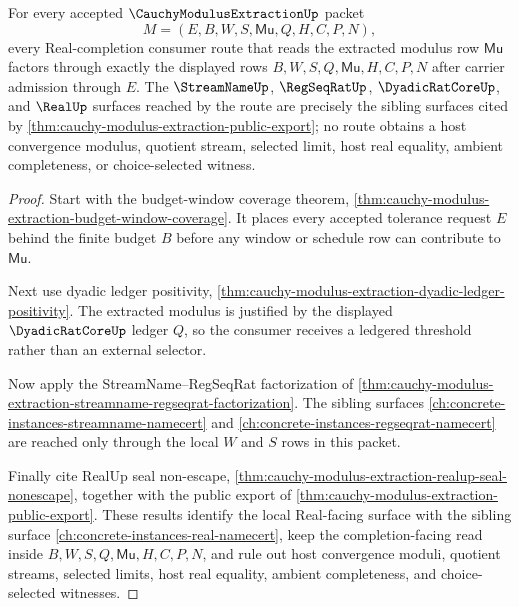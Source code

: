 \begin{theorem}
\label{thm:cauchy-modulus-extraction-real-completion-consumer-bridge}
For every accepted $\CauchyModulusExtractionUp$ packet
$$
M=(E,B,W,S,\mathsf{Mu},Q,H,C,P,N),
$$
every Real-completion consumer route that reads the extracted modulus row $\mathsf{Mu}$ factors through exactly the displayed rows $B,W,S,Q,\mathsf{Mu},H,C,P,N$ after carrier admission through $E$. The $\StreamNameUp$, $\RegSeqRatUp$, $\DyadicRatCoreUp$, and $\RealUp$ surfaces reached by the route are precisely the sibling surfaces cited by \autoref{thm:cauchy-modulus-extraction-public-export}; no route obtains a host convergence modulus, quotient stream, selected limit, host real equality, ambient completeness, or choice-selected witness.
\end{theorem}
\begin{proof}
Start with the budget-window coverage theorem, \autoref{thm:cauchy-modulus-extraction-budget-window-coverage}. It places every accepted tolerance request $E$ behind the finite budget $B$ before any window or schedule row can contribute to $\mathsf{Mu}$.

Next use dyadic ledger positivity, \autoref{thm:cauchy-modulus-extraction-dyadic-ledger-positivity}. The extracted modulus is justified by the displayed $\DyadicRatCoreUp$ ledger $Q$, so the consumer receives a ledgered threshold rather than an external selector.

Now apply the StreamName--RegSeqRat factorization of \autoref{thm:cauchy-modulus-extraction-streamname-regseqrat-factorization}. The sibling surfaces \autoref{ch:concrete-instances-streamname-namecert} and \autoref{ch:concrete-instances-regseqrat-namecert} are reached only through the local $W$ and $S$ rows in this packet.

Finally cite RealUp seal non-escape, \autoref{thm:cauchy-modulus-extraction-realup-seal-nonescape}, together with the public export of \autoref{thm:cauchy-modulus-extraction-public-export}. These results identify the local Real-facing surface with the sibling surface \autoref{ch:concrete-instances-real-namecert}, keep the completion-facing read inside $B,W,S,Q,\mathsf{Mu},H,C,P,N$, and rule out host convergence moduli, quotient streams, selected limits, host real equality, ambient completeness, and choice-selected witnesses.
\end{proof}

